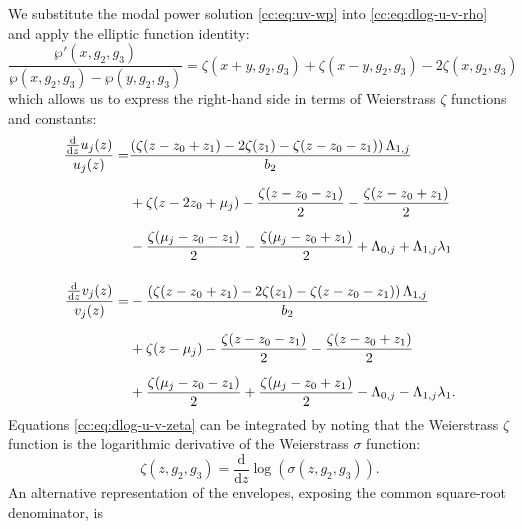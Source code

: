 \documentclass[11pt,a4paper]{article}
\begin{document}
We substitute the modal power solution \eqref{cc:eq:uv-wp} into \eqref{cc:eq:dlog-u-v-rho} and apply the elliptic function identity:
\begin{equation}
\frac{\wp'{\left(x,g_{2},g_{3} \right)}}{\wp{\left(x,g_{2},g_{3} \right)} - \wp{\left(y,g_{2},g_{3} \right)}} = \zeta{\left(x + y,g_{2},g_{3} \right)} + \zeta{\left(x - y,g_{2},g_{3} \right)} - 2 \zeta{\left(x,g_{2},g_{3} \right)}
\end{equation}
which allows us to express the right-hand side in terms of Weierstrass $\zeta$ functions and constants:
\begin{align}
\frac{\frac{\mathrm{d}}{\mathrm{d} z} u_j{\left(z \right)}}{u_j{\left(z \right)}} =& \frac{\left(\zeta{\left(z - z_{0} + z_{1} \right)} - 2 \zeta{\left(z_{1} \right)} - \zeta{\left(z - z_{0} - z_{1} \right)}\right) {\Lambda}_{1,j}}{b_2} \nonumber \\[6pt]
& + \zeta{\left(z - 2 z_{0} + {\mu}_{j} \right)} - \frac{\zeta{\left(z - z_{0} - z_{1} \right)}}{2} - \frac{\zeta{\left(z - z_{0} + z_{1} \right)}}{2} \nonumber \\[6pt]
& - \frac{\zeta{\left({\mu}_{j} - z_{0} - z_{1}\right)}}{2} - \frac{\zeta{\left({\mu}_{j} - z_{0} + z_{1}\right)}}{2} + {\Lambda}_{0,j} + {\Lambda}_{1,j} {\lambda}_{1} \notag \\[12pt]
\frac{\frac{\mathrm{d}}{\mathrm{d} z} v_j{\left(z \right)}}{v_j{\left(z \right)}} =& - \frac{\left(\zeta{\left(z - z_{0} + z_{1} \right)} - 2 \zeta{\left(z_{1} \right)} - \zeta{\left(z - z_{0} - z_{1} \right)}\right) {\Lambda}_{1,j}}{b_2} \nonumber \\[6pt]
& + \zeta{\left(z - {\mu}_{j} \right)} - \frac{\zeta{\left(z - z_{0} - z_{1} \right)}}{2} - \frac{\zeta{\left(z - z_{0} + z_{1} \right)}}{2} \nonumber \\[6pt]
& + \frac{\zeta{\left({\mu}_{j} - z_{0} - z_{1}\right)}}{2} + \frac{\zeta{\left({\mu}_{j} - z_{0} + z_{1} \right)}}{2} - {\Lambda}_{0,j} - {\Lambda}_{1,j} {\lambda}_{1}. \label{cc:eq:dlog-u-v-zeta}
\end{align}
Equations \eqref{cc:eq:dlog-u-v-zeta} can be integrated by noting that the Weierstrass $\zeta$ function is the logarithmic derivative of the Weierstrass $\sigma$ function:
\begin{equation}
\label{cc:eq:zeta-dlog_sigma}
\zeta\left(z, g_2, g_3\right)=\frac{\mathrm{d}}{\mathrm{d} z} \log{\left(\sigma\left(z, g_2, g_3\right)\right)}.
\end{equation}
An alternative representation of the envelopes, exposing the common square-root denominator, is
\end{document}

